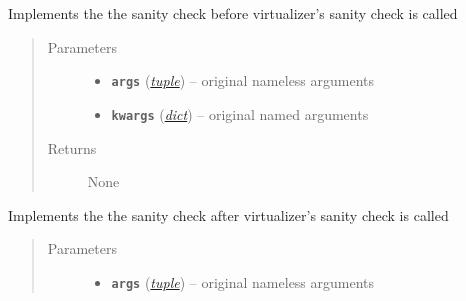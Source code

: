 \documentclass[letterpaper,10pt,english]{sphinxmanual}
\begin{document}
\begin{fulllineitems}
\begin{fulllineitems}
\end{fulllineitems}


\begin{fulllineitems}
\label{orchest/policy_enforcement:escape.orchest.policy_enforcement.PolicyEnforcement.pre_sanity_check}
Implements the the sanity check before virtualizer's sanity check is called
\begin{quote}\begin{description}
\item[{Parameters}] \leavevmode\begin{itemize}
\item {} 
\textbf{\texttt{args}} (\href{https://docs.python.org/2.7/library/functions.html\#tuple}{\emph{tuple}}) -- original nameless arguments

\item {} 
\textbf{\texttt{kwargs}} (\href{https://docs.python.org/2.7/library/stdtypes.html\#dict}{\emph{dict}}) -- original named arguments

\end{itemize}

\item[{Returns}] \leavevmode
None

\end{description}\end{quote}

\end{fulllineitems}


\begin{fulllineitems}
\label{orchest/policy_enforcement:escape.orchest.policy_enforcement.PolicyEnforcement.post_sanity_check}
Implements the the sanity check after virtualizer's sanity check is called
\begin{quote}\begin{description}
\item[{Parameters}] \leavevmode\begin{itemize}
\item {} 
\textbf{\texttt{args}} (\href{https://docs.python.org/2.7/library/functions.html\#tuple}{\emph{tuple}}) -- original nameless arguments


\end{itemize}
\end{description}
\end{quote}
\end{fulllineitems}
\end{fulllineitems}
\end{document}
